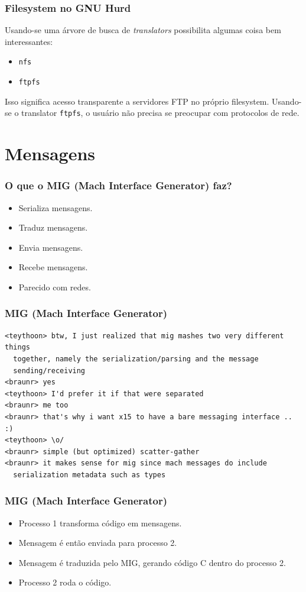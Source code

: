 \documentclass[10pt]{beamer}
\theoremstyle{plain}
\newcommand{\code}[1]{\lstinline[mathescape=true]{#1}}
\begin{document}
\begin{frame}
  \frametitle{Filesystem no GNU Hurd}

  Usando-se uma árvore de busca de \textit{translators} possibilita algumas coisa bem
  interessantes:

  \begin{itemize}
    \item \code{nfs}
    \item \code{ftpfs}
  \end{itemize}

  Isso significa acesso transparente a servidores FTP no próprio filesystem. Usando-se o translator
  \code{ftpfs}, o usuário não precisa se preocupar com protocolos de rede.
\end{frame}

\section{Mensagens}

\begin{frame}
  \frametitle{O que o MIG (Mach Interface Generator) faz?}
  \begin{itemize}
    \item Serializa mensagens.
    \item Traduz mensagens.
    \item Envia mensagens.
    \item Recebe mensagens.
    \item Parecido com redes.
  \end{itemize}
\end{frame}

\begin{frame}[fragile]
  \frametitle{MIG (Mach Interface Generator)}
  \begin{lstlisting}[mathescape=true,showstringspaces=false,numbers=none,frame=single]
<teythoon> btw, I just realized that mig mashes two very different things
  together, namely the serialization/parsing and the message
  sending/receiving
<braunr> yes
<teythoon> I'd prefer it if that were separated
<braunr> me too
<braunr> that's why i want x15 to have a bare messaging interface .. :)
<teythoon> \o/
<braunr> simple (but optimized) scatter-gather
<braunr> it makes sense for mig since mach messages do include
  serialization metadata such as types
  \end{lstlisting}
\end{frame}

\begin{frame}
  \frametitle{MIG (Mach Interface Generator)}
  \begin{itemize}
    \item Processo 1 transforma código em mensagens.
    \item Mensagem é então enviada para processo 2.
    \item Mensagem é traduzida pelo MIG, gerando código C dentro do processo 2.
    \item Processo 2 roda o código.
  \end{itemize}
\end{frame}
\end{document}
